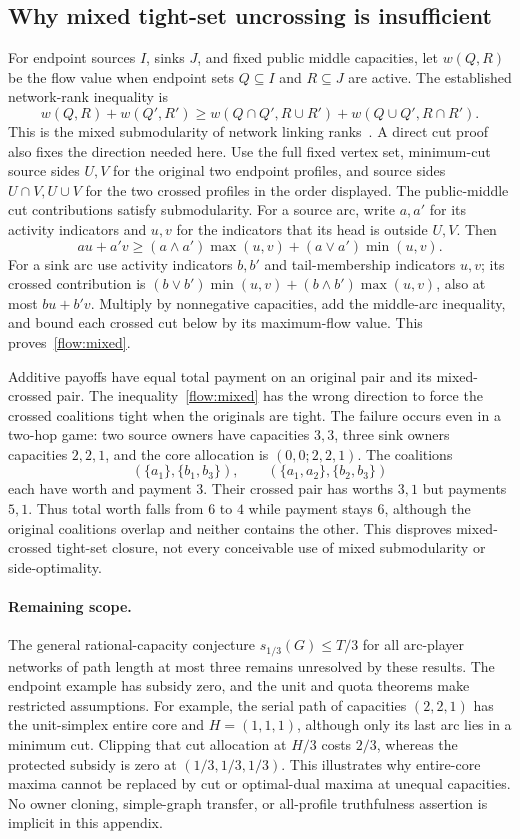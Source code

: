 \subsection{Why mixed tight-set uncrossing is insufficient}
For endpoint sources $I$, sinks $J$, and fixed public middle capacities,
let $w(Q,R)$ be the flow value when endpoint sets $Q\subseteq I$ and
$R\subseteq J$ are active. The established network-rank inequality is
\begin{equation}\label{flow:mixed}
 w(Q,R)+w(Q',R')\ge
 w(Q\cap Q',R\cup R')+w(Q\cup Q',R\cap R').
\end{equation}
This is the mixed submodularity of network linking
ranks~\cite{flow:Goemans2011}. A direct cut proof also fixes the direction
needed here. Use the full fixed vertex set, minimum-cut source sides
$U,V$ for the original two endpoint profiles, and source sides
$U\cap V,U\cup V$ for the two crossed profiles in the order displayed.
The public-middle cut contributions satisfy submodularity. For a source
arc, write $a,a'$ for its activity indicators and $u,v$ for the
indicators that its head is outside $U,V$. Then
\[
 au+a'v\ge (a\wedge a')\max(u,v)+(a\vee a')\min(u,v).
\]
For a sink arc use activity indicators $b,b'$ and tail-membership
indicators $u,v$; its crossed contribution is
$(b\vee b')\min(u,v)+(b\wedge b')\max(u,v)$, also at most
$bu+b'v$. Multiply by nonnegative capacities, add the middle-arc
inequality, and bound each crossed cut below by its maximum-flow value.
This proves~\eqref{flow:mixed}.

Additive payoffs have equal total payment on an original pair and its
mixed-crossed pair. The inequality~\eqref{flow:mixed} has the wrong
direction to force the crossed coalitions tight when the originals are
tight. The failure occurs even in a two-hop game: two source owners have
capacities $3,3$, three sink owners capacities $2,2,1$, and the core
allocation is $(0,0;2,2,1)$. The coalitions
\[
 (\{a_1\},\{b_1,b_3\}),\qquad
 (\{a_1,a_2\},\{b_2,b_3\})
\]
each have worth and payment $3$. Their crossed pair has worths $3,1$
but payments $5,1$. Thus total worth falls from $6$ to $4$ while
payment stays $6$, although the original coalitions overlap and neither
contains the other. This disproves mixed-crossed tight-set closure, not
every conceivable use of mixed submodularity or side-optimality.

\paragraph{Remaining scope.}
The general rational-capacity conjecture
$s_{1/3}(G)\le T/3$ for all arc-player networks of path length at most
three remains unresolved by these results. The endpoint example has
subsidy zero, and the unit and quota theorems make restricted assumptions.
For example, the serial path of capacities $(2,2,1)$ has the unit-simplex
entire core and $H=(1,1,1)$, although only its last arc lies in a minimum
cut. Clipping that cut allocation at $H/3$ costs $2/3$, whereas the
protected subsidy is zero at $(1/3,1/3,1/3)$. This illustrates why
entire-core maxima cannot be replaced by cut or optimal-dual maxima at
unequal capacities. No owner cloning, simple-graph transfer, or all-profile
truthfulness assertion is implicit in this appendix.
